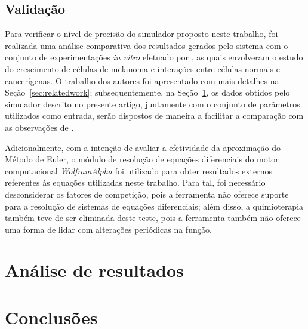 \documentclass[12pt]{article}
\begin{document}
\subsection{Validação}

Para verificar o nível de precisão do simulador proposto neste trabalho, foi realizada uma análise comparativa dos resultados gerados pelo sistema com o conjunto de experimentações \textit{in vitro} efetuado por \cite{Cornil1991}, as quais envolveram o estudo do crescimento de células de melanoma e interações entre células normais e cancerígenas. O trabalho dos autores foi apresentado com mais detalhes na Seção~\ref{sec:relatedwork}; subsequentemente, na Seção~\ref{sec:results}, os dados obtidos pelo simulador descrito no presente artigo, juntamente com o conjunto de parâmetros utilizados como entrada, serão dispostos de maneira a facilitar a comparação com as observações de \cite{Cornil1991}.

Adicionalmente, com a intenção de avaliar a efetividade da aproximação do Método de Euler, o módulo de resolução de equações diferenciais do motor computacional \emph{WolframAlpha} foi utilizado para obter resultados externos referentes às equações utilizadas neste trabalho. Para tal, foi necessário desconsiderar os fatores de competição, pois a ferramenta não oferece suporte para a resolução de sistemas de equações diferenciais; além disso, a quimioterapia também teve de ser eliminada deste teste, pois a ferramenta também não oferece uma forma de lidar com alterações periódicas na função.

\section{Análise de resultados} \label{sec:results}



\section{Conclusões} \label{sec:conclusions}
\end{document}
